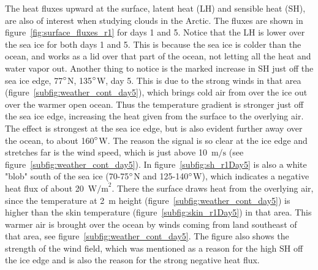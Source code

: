 The heat fluxes upward at the surface, latent heat (LH) and sensible heat (SH), are also of interest when studying clouds in the Arctic. The fluxes are shown in figure~\ref{fig:surface_fluxes_r1} for days 1 and 5. Notice that the LH is lower over the sea ice for both days 1 and 5. This is because the sea ice is colder than the ocean, and works as a lid over that part of the ocean, not letting all the heat and water vapor out. Another thing to notice is the marked increase in SH just off the sea ice edge, 77$\degree$N, 135$\degree$W, day 5. This is due to the strong winds in that area (figure~\ref{subfig:weather_cont_day5}), which brings cold air from over the ice out over the warmer open ocean. Thus the temperature gradient is stronger just off the sea ice edge, increasing the heat given from the surface to the overlying air. The effect is strongest at the sea ice edge, but is also evident further away over the ocean, to about 160$\degree$W. The reason the signal is so clear at the ice edge and stretches far is the wind speed, which is just above 10~$\text{m/s}$ (see figure~\ref{subfig:weather_cont_day5}). In figure~\ref{subfig:sh_r1Day5} is also a white "blob" south of the sea ice (70-75$\degree$N and 125-140$\degree$W), which indicates a negative heat flux of about 20~$\text{W/m}^2$. There the surface draws heat from the overlying air, since the temperature at 2~m height (figure~\ref{subfig:weather_cont_day5}) is higher than the skin temperature (figure~\ref{subfig:skin_r1Day5}) in that area. This warmer air is brought over the ocean by winds coming from land southeast of that area, see figure~\ref{subfig:weather_cont_day5}. The figure also shows the strength of the wind field, which was mentioned as a reason for the high SH off the ice edge and is also the reason for the strong negative heat flux.

